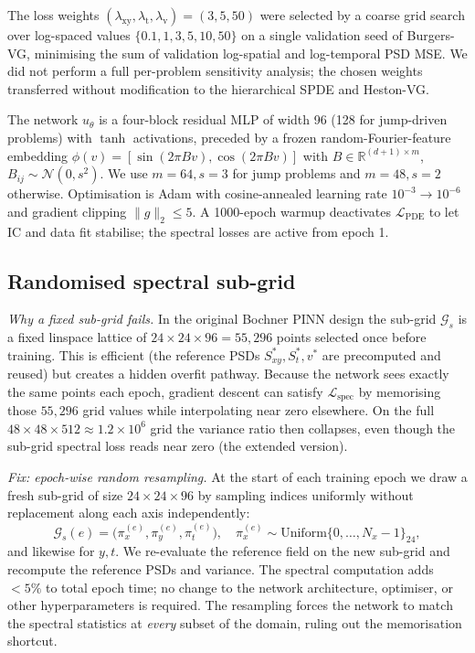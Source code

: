 \documentclass[10pt]{elsarticle}
\begin{document}
The loss weights
\((\lambda_{\mathrm{xy}}, \lambda_{\mathrm t}, \lambda_{\mathrm v}) = (3, 5, 50)\)
were selected by a coarse grid search over log-spaced values
\(\{0.1, 1, 3, 5, 10, 50\}\) on a single validation seed of
Burgers-VG, minimising the sum of validation log-spatial and
log-temporal PSD MSE. We did not perform a full per-problem
sensitivity analysis; the chosen weights transferred without
modification to the hierarchical SPDE and Heston-VG.

The network \(u_\theta\) is a four-block residual MLP of width 96
(128 for jump-driven problems) with \(\tanh\) activations, preceded
by a frozen random-Fourier-feature embedding
\(\phi(v) = [\sin(2\pi B v), \cos(2\pi B v)]\) with
\(B \in \mathbb R^{(d+1)\times m}\),
\(B_{ij} \sim \mathcal N(0, s^2)\). We use \(m=64, s=3\) for jump
problems and \(m=48, s=2\) otherwise. Optimisation is Adam with
cosine-annealed learning rate \(10^{-3} \to 10^{-6}\) and gradient
clipping \(\|g\|_2 \le 5\). A 1000-epoch warmup deactivates
\(\mathcal L_{\mathrm{PDE}}\) to let IC and data fit stabilise; the
spectral losses are active from epoch 1.

\subsection{Randomised spectral sub-grid}
\label{subsec:rand-subgrid}

\emph{Why a fixed sub-grid fails.} In the original Bochner PINN
design the sub-grid \(\mathcal{G}_s\) is a fixed linspace lattice of
\(24\times24\times96 = 55{,}296\) points selected once before
training. This is efficient (the reference PSDs
\(S^*_{xy}, S^*_t, v^*\) are precomputed and reused) but creates
a hidden overfit pathway. Because the network sees exactly the same
points each epoch, gradient descent can satisfy
\(\mathcal{L}_{\mathrm{spec}}\) by memorising those \(55{,}296\)
grid values while interpolating near zero elsewhere. On the full
\(48\times48\times512 \approx 1.2 \times 10^6\) grid the variance
ratio then collapses, even though the sub-grid spectral loss reads
near zero (the extended version).

\emph{Fix: epoch-wise random resampling.} At the start of each
training epoch we draw a fresh sub-grid of size
\(24\times24\times96\) by sampling indices uniformly without
replacement along each axis independently:
\begin{equation}
 \mathcal{G}_s(e) =
 \bigl(\pi_x^{(e)}, \pi_y^{(e)}, \pi_t^{(e)}\bigr),
 \quad
 \pi_x^{(e)} \sim \mathrm{Uniform}\{0,\ldots,N_x{-}1\}_{24},
 \label{eq:rand-subgrid}
\end{equation}
and likewise for \(y, t\). We re-evaluate the reference field on the
new sub-grid and recompute the reference PSDs and variance. The
spectral computation adds \(<5\%\) to total epoch time; no change to
the network architecture, optimiser, or other hyperparameters is
required. The resampling forces the network to match the spectral
statistics at \emph{every} subset of the domain, ruling out the
memorisation shortcut.
\end{document}
